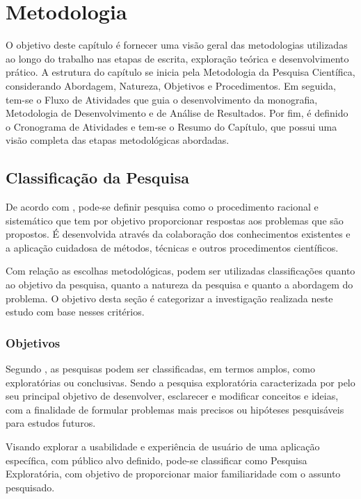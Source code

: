 \chapter[Metodologia]{Metodologia}
\label{chap:Metodologia}

O objetivo deste capítulo é fornecer uma visão geral das metodologias utilizadas ao longo do trabalho nas etapas de escrita, exploração teórica e desenvolvimento prático. 
A estrutura do capítulo se inicia pela Metodologia da Pesquisa Científica, considerando Abordagem, Natureza, Objetivos e Procedimentos. Em seguida, tem-se o Fluxo de Atividades que guia o desenvolvimento  
da monografia, Metodologia de Desenvolvimento e de Análise de Resultados. Por fim, é definido o Cronograma de Atividades e tem-se o Resumo do Capítulo, que possui uma visão completa das etapas 
metodológicas abordadas.

\section{Classificação da Pesquisa}
\label{sec:Classificação da Pesquisa}
De acordo com , pode-se definir pesquisa como o procedimento racional e sistemático que tem por objetivo proporcionar respostas aos problemas que são propostos. É desenvolvida através da colaboração 
dos conhecimentos existentes e a aplicação cuidadosa de métodos, técnicas e outros procedimentos científicos.

Com relação as escolhas metodológicas, podem ser utilizadas classificações quanto ao objetivo da pesquisa, quanto a natureza da pesquisa e quanto a abordagem do problema. O objetivo desta seção é 
categorizar a investigação realizada neste estudo com base nesses critérios.

\subsection{Objetivos}
\label{sec:Objetivos2}
Segundo , as pesquisas podem ser classificadas, em termos amplos, como exploratórias ou conclusivas. Sendo a pesquisa exploratória caracterizada por  pelo seu principal objetivo de 
desenvolver, esclarecer e modificar conceitos e ideias, com a finalidade de formular problemas mais precisos ou hipóteses pesquisáveis para estudos futuros.

Visando explorar a usabilidade e experiência de usuário de uma aplicação específica, com público alvo definido, pode-se classificar como Pesquisa Exploratória, com objetivo de proporcionar maior familiaridade 
com o assunto pesquisado.

